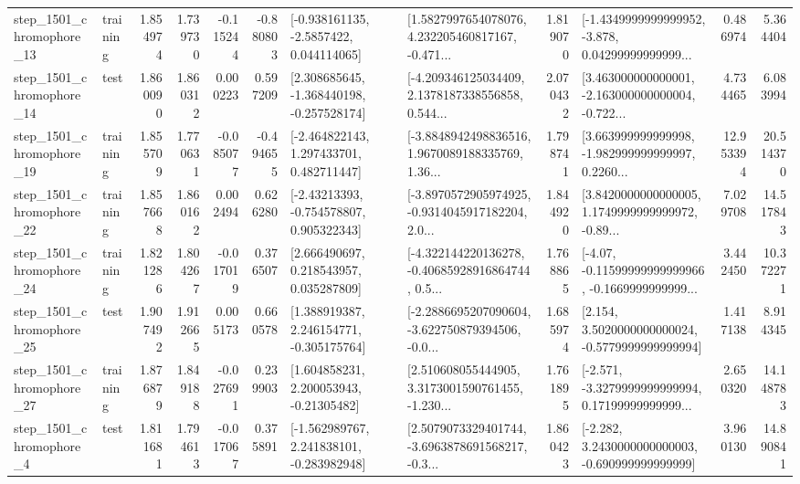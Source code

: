 \begin{tabular}{llrrrrllrlrr}
 step\_1501\_chromophore\_13 &  training &      1.854974 &    1.739730 &     -0.115244 & -0.880803 &     [-0.938161135, -2.5857422, 0.044114065] &  [1.5827997654078076, 4.232205460817167, -0.471... &       1.819070 &  [-1.4349999999999952, -3.878, 0.04299999999999... &            0.486974 &          5.364404 \\
 step\_1501\_chromophore\_14 &      test &      1.860090 &    1.860312 &      0.000223 &  0.597209 &   [2.308685645, -1.368440198, -0.257528174] &  [-4.209346125034409, 2.1378187338556858, 0.544... &       2.070432 &  [3.463000000000001, -2.163000000000004, -0.722... &            4.734465 &          6.083994 \\
 step\_1501\_chromophore\_19 &  training &      1.855709 &    1.770631 &     -0.085077 & -0.494655 &    [-2.464822143, 1.297433701, 0.482711447] &  [-3.8848942498836516, 1.9670089188335769, 1.36... &       1.798741 &  [3.663999999999998, -1.982999999999997, 0.2260... &           12.953394 &         20.514370 \\
 step\_1501\_chromophore\_22 &  training &      1.857668 &    1.860162 &      0.002494 &  0.626280 &    [-2.43213393, -0.754578807, 0.905322343] &  [-3.8970572905974925, -0.9314045917182204, 2.0... &       1.844920 &  [3.8420000000000005, 1.1749999999999972, -0.89... &            7.029708 &         14.517843 \\
 step\_1501\_chromophore\_24 &  training &      1.821286 &    1.804267 &     -0.017019 &  0.376507 &     [2.666490697, 0.218543957, 0.035287809] &  [-4.322144220136278, -0.40685928916864744, 0.5... &       1.768865 &  [-4.07, -0.11599999999999966, -0.1669999999999... &            3.442450 &         10.372271 \\
 step\_1501\_chromophore\_25 &      test &      1.907492 &    1.912665 &      0.005173 &  0.660578 &    [1.388919387, 2.246154771, -0.305175764] &  [-2.2886695207090604, -3.622750879394506, -0.0... &       1.685974 &   [2.154, 3.5020000000000024, -0.5779999999999994] &            1.417138 &          8.914345 \\
 step\_1501\_chromophore\_27 &  training &      1.876879 &    1.849188 &     -0.027691 &  0.239903 &     [1.604858231, 2.200053943, -0.21305482] &  [2.510608055444905, 3.3173001590761455, -1.230... &       1.761895 &  [-2.571, -3.3279999999999994, 0.17199999999999... &            2.650320 &         14.148783 \\
  step\_1501\_chromophore\_4 &      test &      1.811681 &    1.794613 &     -0.017067 &  0.375891 &   [-1.562989767, 2.241838101, -0.283982948] &  [2.5079073329401744, -3.6963878691568217, -0.3... &       1.860423 &   [-2.282, 3.2430000000000003, -0.690999999999999] &            3.960130 &         14.890841 \\

\end{tabular}
